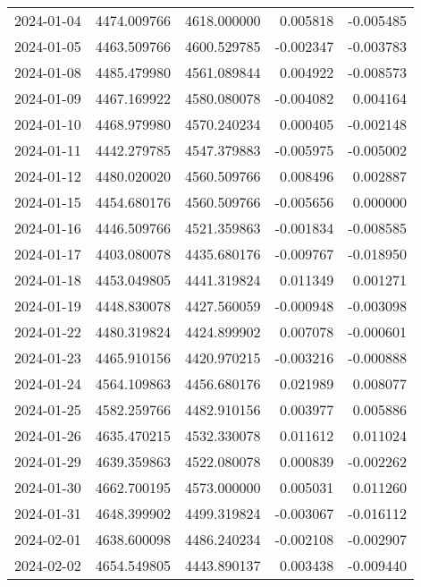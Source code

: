 \begin{tabular}{lrrrr}
2024-01-04 & 4474.009766 & 4618.000000 &        0.005818 &    -0.005485 \\
2024-01-05 & 4463.509766 & 4600.529785 &       -0.002347 &    -0.003783 \\
2024-01-08 & 4485.479980 & 4561.089844 &        0.004922 &    -0.008573 \\
2024-01-09 & 4467.169922 & 4580.080078 &       -0.004082 &     0.004164 \\
2024-01-10 & 4468.979980 & 4570.240234 &        0.000405 &    -0.002148 \\
2024-01-11 & 4442.279785 & 4547.379883 &       -0.005975 &    -0.005002 \\
2024-01-12 & 4480.020020 & 4560.509766 &        0.008496 &     0.002887 \\
2024-01-15 & 4454.680176 & 4560.509766 &       -0.005656 &     0.000000 \\
2024-01-16 & 4446.509766 & 4521.359863 &       -0.001834 &    -0.008585 \\
2024-01-17 & 4403.080078 & 4435.680176 &       -0.009767 &    -0.018950 \\
2024-01-18 & 4453.049805 & 4441.319824 &        0.011349 &     0.001271 \\
2024-01-19 & 4448.830078 & 4427.560059 &       -0.000948 &    -0.003098 \\
2024-01-22 & 4480.319824 & 4424.899902 &        0.007078 &    -0.000601 \\
2024-01-23 & 4465.910156 & 4420.970215 &       -0.003216 &    -0.000888 \\
2024-01-24 & 4564.109863 & 4456.680176 &        0.021989 &     0.008077 \\
2024-01-25 & 4582.259766 & 4482.910156 &        0.003977 &     0.005886 \\
2024-01-26 & 4635.470215 & 4532.330078 &        0.011612 &     0.011024 \\
2024-01-29 & 4639.359863 & 4522.080078 &        0.000839 &    -0.002262 \\
2024-01-30 & 4662.700195 & 4573.000000 &        0.005031 &     0.011260 \\
2024-01-31 & 4648.399902 & 4499.319824 &       -0.003067 &    -0.016112 \\
2024-02-01 & 4638.600098 & 4486.240234 &       -0.002108 &    -0.002907 \\
2024-02-02 & 4654.549805 & 4443.890137 &        0.003438 &    -0.009440 \\
\bottomrule
\end{tabular}

